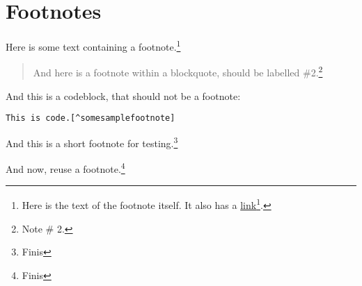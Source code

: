 
\def\mytitle{MultiMarkdown Footer Test}

\part{Footnotes}
\label{footnotes}

Here is some text containing a footnote.\footnote{Here is the text of the footnote itself. It also has a \href{http://somelink.com}{link}\footnote{\href{http://somelink.com}{http:/\slash somelink.com}}.}

\begin{quote}

And here is a footnote within a blockquote, should be labelled \#2.\footnote{Note \# 2.}
\end{quote}

And this is a codeblock, that should not be a footnote:

\begin{verbatim}
This is code.[^somesamplefootnote]
\end{verbatim}


And this is a short footnote for testing.\footnote{Finis}

And now, reuse a footnote.\footnote{Finis}




